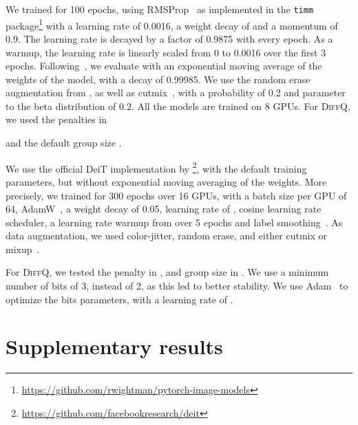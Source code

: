 \documentclass{article}
\newcommand{\diffq}{\textsc{DiffQ}\xspace}
\begin{document}
We trained for 100 epochs, using RMSProp~\cite{tieleman2012lecture} as
implemented in the \texttt{timm} package\footnote{\url{https://github.com/rwightman/pytorch-image-models}}
with a learning rate of 0.0016, a weight decay of  and a momentum of 0.9. The learning rate is decayed
by a factor of 0.9875 with every epoch. As a warmup, the learning rate is linearly scaled from 0 to 0.0016 over the first 3 epochs. Following~\citep{rw2019timm}, we evaluate with an exponential moving average of the weights of the model, with
a decay of 0.99985. We use the random erase augmentation from \citep{rw2019timm}, as well as cutmix~\citep{yun2019cutmix},
with a probability of 0.2 and parameter to the beta distribution of 0.2.
All the models are trained on 8 GPUs. For \diffq, we used the penalties  in 

and the default group size .

We use the official DeiT implementation by \citet{touvron2020training}\footnote{\url{https://github.com/facebookresearch/deit}}, with the default
training parameters, but without exponential moving averaging of the weights. More precisely, we trained for 300 epochs over 16 GPUs, with a batch size per GPU of 64, AdamW~\citep{loshchilov2017decoupled}, a weight decay of 0.05, learning rate of , cosine
learning rate scheduler, a learning rate warmup from  over 5 epochs and label smoothing~\citep{szegedy2016rethinking}. As data augmentation, we used color-jitter, random erase, and either cutmix or mixup~\citep{zhang2017mixup}.

For \diffq, we tested the penalty  in ,
and group size  in . We use a minimum number of bits of 3, instead of 2, as this led to better stability. 
We use Adam~\citep{adam} to optimize the bits parameters, with a learning rate of .

\vspace{-0.2cm}
\section{Supplementary results}
\vspace{-0.2cm}
\label{app:results}
\end{document}
